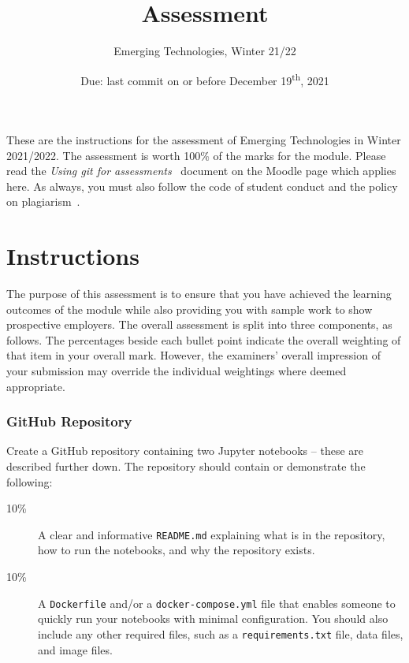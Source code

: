 \documentclass[a4paper, 12pt]{scrartcl}
\title{\vspace{-20mm}Assessment}
\author{Emerging Technologies, Winter 21/22}
\date{Due: last commit on or before December 19\textsuperscript{th}, 2021\vspace{-6mm}}
\begin{document}
  
  \maketitle

  These are the instructions for the assessment of Emerging Technologies in Winter 2021/2022.
  The assessment is worth 100\% of the marks for the module.
  Please read the \emph{Using git for assessments}~\cite{usinggit} document on the Moodle page which applies here.
  As always, you must also follow the code of student conduct and the policy on plagiarism~\cite{gmitqaf}.

  \section*{Instructions}
  
  The purpose of this assessment is to ensure that you have achieved the learning outcomes of the module while also providing you with sample work to show prospective employers.
  The overall assessment is split into three components, as follows.
  The percentages beside each bullet point indicate the overall weighting of that item in your overall mark.
  However, the examiners' overall impression of your submission may override the individual weightings where deemed appropriate.

  \subsubsection*{GitHub Repository}
  Create a GitHub repository containing two Jupyter notebooks -- these are described further down.
  The repository should contain or demonstrate the following:
  \begin{description}
    \item[10\%] A clear and informative \texttt{README.md} explaining what is in the repository, how to run the notebooks, and why the repository exists.
    \item[10\%] A \texttt{Dockerfile} and/or a \texttt{docker-compose.yml} file that enables someone to quickly run your notebooks with minimal configuration. You should also include any other required files, such as a \texttt{requirements.txt} file, data files, and image files.
  \end{description}
\end{document}
